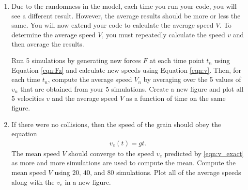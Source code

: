 \documentclass[11pt, a4paper]{article}
\begin{document}
\begin{enumerate}
\item{Due to the randomness in the model, each time you run your code,
you will see a different result.  However, the average results should
be more or less the same.  You will now extend your code to
calculate the average speed $V$.  
To determine the average speed $V$,  you must repeatedly calculate the 
speed $v$ and then average the results.

Run 5 simulations by 
generating new forces $F$ at each time point $t_n$ using Equation
\eqref{eqn:Fz} and calculate new speeds using Equation \eqref{eqn:v}.  
Then, for each time $t_n$,
compute the average speed $V_n$ by averaging over the 5 values
of $v_n$ that are obtained from your 5 simulations.  
Create a new figure and 
plot all 5 velocities $v$ and 
the average speed $V$ as a function of time on the same figure.}

\item{If there were no collisions, then the speed of the grain should obey
the equation
\begin{align}
v_e(t) = g t.
\label{eqn:v_exact}
\end{align}
The mean speed $V$ should converge to the
speed $v_e$ predicted by \eqref{eqn:v_exact} as more and more 
simulations are used to compute the mean.  Compute the
mean speed $V$ using $20$, $40$, and $80$ simulations.
Plot all of the average speeds along with the $v_e$ in
a new figure.}

\end{enumerate}
\end{document}
